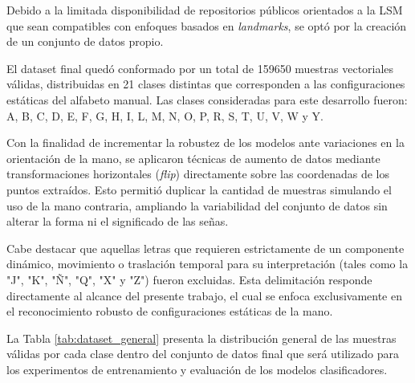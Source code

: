 	
	Debido a la limitada disponibilidad de repositorios públicos orientados a la LSM que sean compatibles con enfoques basados en \textit{landmarks}, se optó por la creación de un conjunto de datos propio.
	
	El dataset final quedó conformado por un total de 159650 muestras vectoriales válidas, distribuidas en 21 clases distintas que corresponden a las configuraciones estáticas del alfabeto manual. Las clases consideradas para este desarrollo fueron: A, B, C, D, E, F, G, H, I, L, M, N, O, P, R, S, T, U, V, W y Y.
	
	Con la finalidad de incrementar la robustez de los modelos ante variaciones en la orientación de la mano, se aplicaron técnicas de aumento de datos mediante transformaciones horizontales (\textit{flip}) directamente sobre las coordenadas de los puntos extraídos. Esto permitió duplicar la cantidad de muestras simulando el uso de la mano contraria, ampliando la variabilidad del conjunto de datos sin alterar la forma ni el significado de las señas.
	
	Cabe destacar que aquellas letras que requieren estrictamente de un componente dinámico, movimiento o traslación temporal para su interpretación (tales como la "J", "K", "Ñ", "Q", "X" y "Z") fueron excluidas. Esta delimitación responde directamente al alcance del presente trabajo, el cual se enfoca exclusivamente en el reconocimiento robusto de configuraciones estáticas de la mano.
	
	La Tabla \ref{tab:dataset_general} presenta la distribución general de las muestras válidas por cada clase dentro del conjunto de datos final que será utilizado para los experimentos de entrenamiento y evaluación de los modelos clasificadores.
	
